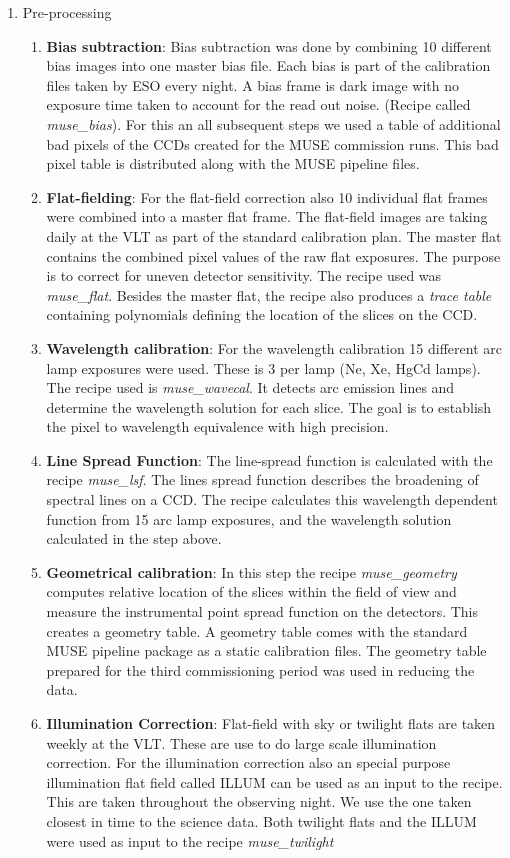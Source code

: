 \begin{enumerate}
        \item Pre-processing
                \begin{enumerate}[I]
			\item \textbf{Bias subtraction}: Bias subtraction was done by combining 10 different bias images into one master bias file. Each bias is part of the calibration files taken by ESO every night. A bias frame is dark image with no exposure time taken to account for the read out noise. (Recipe called \emph{muse\_bias}). For this an all subsequent steps we used a table of additional bad pixels of the CCDs created for the MUSE commission runs. This bad pixel table is distributed along with the MUSE pipeline files. 
			\item \textbf{Flat-fielding}: For the flat-field correction also 10 individual flat frames were combined into a master flat frame. The flat-field images are taking daily at the VLT as part of the standard calibration plan.  The master flat  contains  the  combined  pixel  values  of  the  raw  flat exposures. The purpose is to correct for uneven detector sensitivity. The recipe used was \emph{muse\_flat}. Besides the master flat, the recipe also produces a \emph{trace table} containing polynomials defining the location of the slices on the CCD. 
			\item \textbf{Wavelength calibration}: For the wavelength calibration 15 different arc lamp exposures were used. These is 3 per lamp (Ne, Xe, HgCd lamps). The recipe used is \emph{muse\_wavecal}. It detects arc emission lines and determine the wavelength solution for each slice. The goal is to establish the pixel to wavelength equivalence with high precision.
			\item \textbf{Line Spread Function}: The line-spread function is calculated with the recipe \emph{muse\_lsf}. The lines spread function describes the broadening of spectral lines on a CCD. The recipe calculates this  wavelength dependent function from 15 arc lamp exposures, and the wavelength solution calculated in the step above.  
			\item \textbf{Geometrical calibration}: In this step the recipe \emph{muse\_geometry} computes  relative  location  of the slices within the field of view and measure the instrumental point spread function on the detectors. This creates a geometry table. A geometry table comes with the standard MUSE pipeline package as a static calibration files. The geometry table prepared for the third commissioning period was used in reducing the data. 
			\item \textbf{Illumination Correction}: Flat-field with sky or twilight flats are taken weekly at the VLT. These are use to do large scale illumination correction. For the illumination correction also an special purpose  illumination flat field called ILLUM can be used as an input to the recipe. This are taken throughout the observing night. We use the one taken closest in time to the science data. Both twilight flats and the ILLUM were used as input to the recipe \emph{muse\_twilight}
    

\end{enumerate}
\end{enumerate}
